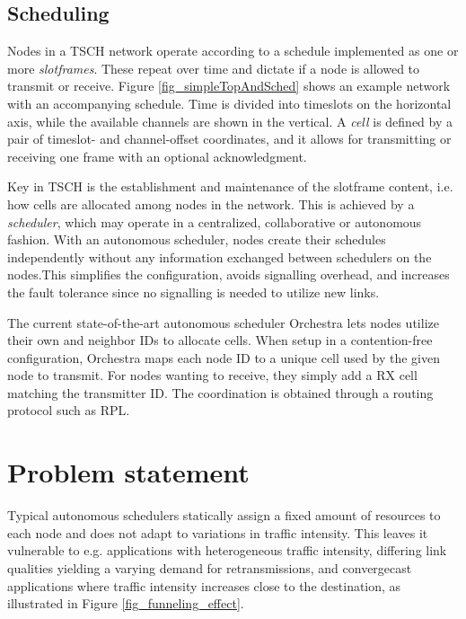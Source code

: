 \documentclass[journal,comsoc]{IEEEtran}
\begin{document}
\subsection{Scheduling}

Nodes in a TSCH network operate according to a schedule implemented as one or more \textit{slotframes}. These repeat over time and dictate if a node is allowed to transmit or receive. Figure \ref{fig_simpleTopAndSched} shows an example network with an accompanying schedule. Time is divided into timeslots on the horizontal axis, while the available channels are shown in the vertical. A \textit{cell} is defined by a pair of timeslot- and channel-offset coordinates, and it allows for transmitting or receiving one frame with an optional acknowledgment.

Key in TSCH is the establishment and maintenance of the slotframe content, i.e. how cells are allocated among nodes in the network. This is achieved by a \textit{scheduler}, which may operate in a centralized, collaborative or autonomous fashion. With an autonomous scheduler, nodes create their schedules independently without any information exchanged between schedulers on the nodes.This simplifies the configuration, avoids signalling overhead, and increases the fault tolerance since no signalling is needed to utilize new links.

The current state-of-the-art autonomous scheduler Orchestra \cite{OrchestraRobustMeshDuquennoy2015} lets nodes utilize their own and neighbor IDs to allocate cells. When setup in a contention-free configuration, Orchestra maps each node ID to a unique cell used by the given node to transmit. For nodes wanting to receive, they simply add a RX cell matching the transmitter ID. The coordination is obtained through a routing protocol such as RPL.

\section{Problem statement}

Typical autonomous schedulers statically assign a fixed amount of resources to each node and does not adapt to variations in traffic intensity. This leaves it vulnerable to e.g. applications with heterogeneous traffic intensity, differing link qualities yielding a varying demand for retransmissions, and convergecast applications where traffic intensity increases close to the destination, as illustrated in Figure \ref{fig_funneling_effect}.
\end{document}
